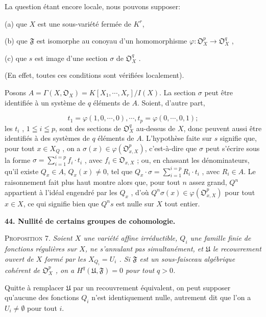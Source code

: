 La question étant encore locale, nous pouvons supposer:

(a) que $X$ est une sous-variété fermée de $K^r$,

(b) que $\mathfrak{F}$ est isomorphe au conoyau d'un homomorphisme $\varphi : \mathfrak{O}^p_X \to \mathfrak{O}^q_X$ ,

(c) que $s$ est image d'une section $\sigma$ de $\mathfrak{O}^q_X$ .

(En effet, toutes ces conditions sont vérifiées localement).

Posons $A = \Gamma(X , \mathfrak{O}_X) = K[X_1 , \cdots , X_r]/I(X)$. La section $\sigma$ peut être identifiée à un système de $q$ éléments de $A$. Soient, d'autre part,

\begin{equation*}
t_1 = \varphi(1, 0, \cdots , 0), \cdots , t_p = \varphi(0, \cdots , 0, 1);
\end{equation*}
les $t_i$ , $1 \leqq i \leqq p$, sont des sections de $\mathfrak{O}^q_X$ au-dessus de $X$, donc peuvent aussi être identifiés à des systèmes de $q$ éléments de $A$. L'hypothèse faite sur $s$ signifie
que, pour tout $x \in X_Q$ , on a $\sigma(x) \in \varphi(\mathfrak{O}^p_{x,X})$, c'est-à-dire que $\sigma$ peut s'écrire sous la forme $\sigma = \sum_{i=1}^{i=p} f_i \cdot t_i$ , avec $f_i \in \mathfrak{O}_{x,X}$ ; ou, en chassant les dénominateurs, qu'il existe $Q_x \in A$, $Q_x(x) \neq 0$, tel que $Q_x \cdot \sigma = \sum_{i=1}^{i=p} R_i \cdot t_i$ , avec $R_i \in A$. Le raisonnement fait plus haut montre alors que, pour tout $n$ assez grand, $Q^n$ appartient à l'idéal engendré par les $Q_x$ , d'où $Q^n\sigma(x) \in \varphi(\mathfrak{O}^p_{x,X})$ pour tout $x \in X$, ce qui signifie bien que $Q^ns$ est nulle sur $X$ tout entier.


\textbf{44. Nullité de certains groupes de cohomologie.}

\textsc{Proposition} 7. \textit{Soient $X$ une variété affine irréductible, $Q_i$ une famille finie de fonctions régulières sur $X$, ne s'annulant pas simultanément, et $\mathfrak{U}$ le recouvrement ouvert de $X$ formé par les $X_{Q_i} = U_i$ . Si $\mathfrak{F}$ est un sous-faisceau algébrique cohérent de $\mathfrak{O}^p_X$ , on a $H^q(\mathfrak{U}, \mathfrak{F}) = 0$ pour tout $q > 0$.}

Quitte à remplacer $\mathfrak{U}$ par un recouvrement équivalent, on peut supposer qu'aucune des fonctions $Q_i$ n'est identiquement nulle, autrement dit que l'on a $U_i \neq \emptyset$ pour tout $i$.

